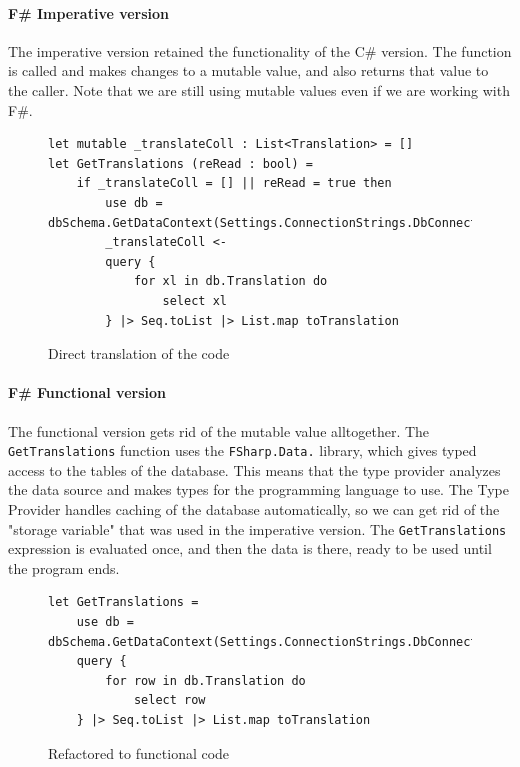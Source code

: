 \documentclass[12pt, a4paper]{article}
\newcommand{\code}[1]{{\small \texttt{#1}}}
\begin{document}
\newpage


\paragraph{F\# Imperative version} The imperative version retained the functionality of the C\# version. The function is called and makes changes to a mutable value, and also returns that value to the caller. Note that we are still using mutable values even if we are working with F\#.

\begin{figure}[!h]
\begin{lstlisting}
let mutable _translateColl : List<Translation> = []
let GetTranslations (reRead : bool) =
    if _translateColl = [] || reRead = true then
        use db = dbSchema.GetDataContext(Settings.ConnectionStrings.DbConnectionString)
        _translateColl <- 
        query {
            for xl in db.Translation do 
                select xl
        } |> Seq.toList |> List.map toTranslation
\end{lstlisting}
\caption{Direct translation of the code}
\end{figure}

\newpage


\paragraph{F\# Functional version} The functional version gets rid of the mutable value alltogether. The \code{GetTranslations} function uses the \code{FSharp.Data.}\newline \code{TypeProviders} library, which gives typed access to the tables of the database. This means that the type provider analyzes the data source and makes types for the programming language to use. The Type Provider handles caching of the database automatically, so we can get rid of the "storage variable" that was used in the imperative version. The \code{GetTranslations} expression is evaluated once, and then the data is there, ready to be used until the program ends.

\begin{figure}[!h]
\begin{lstlisting}
let GetTranslations =
    use db = dbSchema.GetDataContext(Settings.ConnectionStrings.DbConnectionString)
    query {
        for row in db.Translation do 
            select row
    } |> Seq.toList |> List.map toTranslation 
\end{lstlisting}
\caption{Refactored to functional code}
\end{figure}
\end{document}
